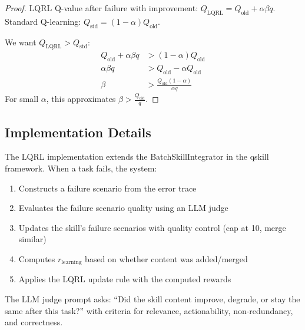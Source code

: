 \begin{proof}
LQRL Q-value after failure with improvement: $Q_{\text{LQRL}} = Q_{\text{old}} + \alpha \beta q$.
Standard Q-learning: $Q_{\text{std}} = (1-\alpha) Q_{\text{old}}$.

We want $Q_{\text{LQRL}} > Q_{\text{std}}$:
\begin{align}
    Q_{\text{old}} + \alpha \beta q &> (1-\alpha) Q_{\text{old}} \\
    \alpha \beta q &> Q_{\text{old}} - \alpha Q_{\text{old}} \\
    \beta &> \frac{Q_{\text{old}}(1 - \alpha)}{\alpha q}
\end{align}
For small $\alpha$, this approximates $\beta > \frac{Q_{\text{old}}}{q}$.
\end{proof}

\subsection{Implementation Details}

The LQRL implementation extends the BatchSkillIntegrator in the qskill framework. When a task fails, the system:
\begin{enumerate}
    \item Constructs a failure scenario from the error trace
    \item Evaluates the failure scenario quality using an LLM judge
    \item Updates the skill's failure scenarios with quality control (cap at 10, merge similar)
    \item Computes $r_{\text{learning}}$ based on whether content was added/merged
    \item Applies the LQRL update rule with the computed rewards
\end{enumerate}

The LLM judge prompt asks: ``Did the skill content improve, degrade, or stay the same after this task?'' with criteria for relevance, actionability, non-redundancy, and correctness.
